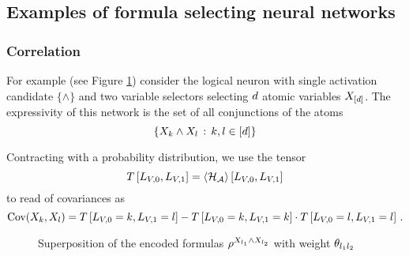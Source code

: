 \subsection{Examples of formula selecting neural networks}




\subsubsection{Correlation}


For example (see Figure \ref{fig:AndSupFTDecomposition}) consider the logical neuron with single activation candidate $\{\land\}$ and two variable selectors selecting $d$ atomic variables $X_{[d]}$.
The expressivity of this network is the set of all conjunctions of the atoms
	\[ \{X_{k} \land X_{l} \, : \, k,l\in[d] \} \]


Contracting with a probability distribution, we use the tensor
	\[ T\left[L_{V,0},L_{V,1}\right] = \left\langle \mathcal{H}_{\mathcal{A}}\right\rangle \left[ L_{V,0},L_{V,1} \right] \]
to read of covariances as
	\[ \mathrm{Cov}(X_{k},X_{l}) = T\left[L_{V,0}=k,L_{V,1}=l\right]  - 
	T\left[L_{V,0}=k,L_{V,1}=k\right]  \cdot T\left[L_{V,0}=l,L_{V,1}=l\right] \, .  \]
	
	
	


\begin{figure}[h]
\begin{center}
	
\end{center}
\caption{Superposition of the encoded formulas $\rho^{X_{l_{1}} \land X_{l_{2}}}$ with weight $\theta_{l_{1} l_{2}}$}
\label{fig:AndSupFTDecomposition}
\end{figure}



